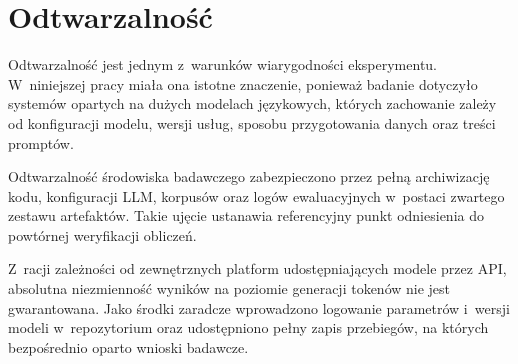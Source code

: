 \section{Odtwarzalność}\label{sec:odtwarzalnosc}

Odtwarzalność jest jednym z~warunków wiarygodności eksperymentu. W~niniejszej
pracy miała ona istotne znaczenie, ponieważ badanie dotyczyło systemów opartych
na dużych modelach językowych, których zachowanie zależy od konfiguracji
modelu, wersji usług, sposobu przygotowania danych oraz treści promptów.

Odtwarzalność środowiska badawczego zabezpieczono przez pełną archiwizację
kodu, konfiguracji LLM, korpusów oraz logów ewaluacyjnych w~postaci zwartego
zestawu artefaktów. Takie ujęcie ustanawia referencyjny punkt odniesienia do
powtórnej weryfikacji obliczeń.

Z~racji zależności od zewnętrznych platform udostępniających modele przez API,
absolutna niezmienność wyników na poziomie generacji tokenów nie jest
gwarantowana. Jako środki zaradcze wprowadzono logowanie parametrów i~wersji
modeli w~repozytorium oraz udostępniono pełny zapis przebiegów, na których
bezpośrednio oparto wnioski badawcze.
